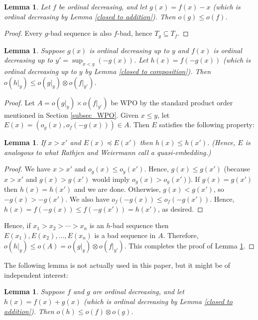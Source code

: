 \documentclass{article}
\newtheorem{Lemma}[Theorem]{Lemma}
\theoremstyle{definition}
\begin{document}
\begin{Lemma}\label{lem_fx_x}
    Let $f$ be ordinal decreasing, and let $g(x) = f(x)-x$ (which is ordinal decreasing by Lemma \ref{closed to addition}). Then $o(g)\le o(f)$.
\end{Lemma}

\begin{proof}
    Every $g$-bad sequence is also $f$-bad, hence $T_g\subseteq T_f$.
\end{proof}

\begin{Lemma}\label{lem_o_composition}
    Suppose $g(x)$ is ordinal decreasing up to $y$ and $f(x)$ is ordinal decreasing up to $y'=\sup_{x<y}(-g(x))$. Let $h(x) = f(-g(x))$ (which is ordinal decreasing up to $y$ by Lemma \ref{closed to composition}). Then $o(h|_y)\le o(g|_y)\otimes o(f|_{y'})$.
\end{Lemma}

\begin{proof}
    Let $A=o(g|_y)\times o(f|_{y'})$ be WPO by the standard product order mentioned in Section \ref{subsec_WPO}. Given $x\le y$, let $E(x) = (o_g(x), o_f(-g(x)))\in A$. Then $E$ satisfies the following property:
    \begin{Lemma}
    If $x>x'$ and $E(x)\preceq E(x')$ then $h(x)\le h(x')$. (Hence, $E$ is analogous to what Rathjen and Weiermann \cite{RATHJEN199349} call a \emph{quasi-embedding}.) 
    \end{Lemma}
    \begin{proof}
        We have $x>x'$ and $o_g(x)\le o_g(x')$. Hence, $g(x)\le g(x')$ (because $x>x'$ and $g(x)>g(x')$ would imply $o_g(x)>o_g(x')$). If $g(x)=g(x')$ then $h(x)=h(x')$ and we are done. Otherwise, $g(x)<g(x')$, so $-g(x)>-g(x')$. We also have $o_f(-g(x))\le o_f(-g(x'))$. Hence, $h(x)=f(-g(x))\le f(-g(x'))=h(x')$, as desired.
    \end{proof}
    Hence, if $x_1> x_2 > \cdots > x_n$ is an $h$-bad sequence then $E(x_1), E(x_2), \ldots, E(x_n)$ is a bad sequence in $A$. Therefore, $o(h|_y)\le o(A) = o(g|_y)\otimes o(f|_{y'})$. This completes the proof of Lemma \ref{lem_o_composition}.
\end{proof}

The following lemma is not actually used in this paper, but it might be of independent interest:

\begin{Lemma}
    Suppose $f$ and $g$ are ordinal decreasing, and let $h(x)=f(x)+g(x)$ (which is ordinal decreasing by Lemma \ref{closed to addition}). Then $o(h)\le o(f)\otimes o(g)$.
\end{Lemma}
\end{document}
